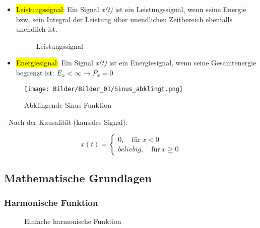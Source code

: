 \begin{itemize}[topsep=2pt]
     \item
     \hl{Leistungssignal}: Ein Signal {\itshape x(t)} ist ein Leistungssignal, wenn seine Energie bzw. sein Integral der Leistung über unendlichen Zeitbereich ebenfalls unendlich ist. \par
     \begin{figure}[h]
         \centering
         \subfigbottomskip=10pt
         \subfigcapskip=3pt
         \hspace{2cm}
     \caption{Leistungssignal}
     \end{figure}
     
     \item
     \hl{Energiesignal}: Ein Signal {\itshape x(t)} ist ein Energiesignal, wenn seine Gesamtenergie begrenzt ist: $E_{x}<\infty \to \bar{P_{x}}=0$\par
\end{itemize}
     
\begin{figure}[H]
    \centering
    \texttt{[image: Bilder/Bilder\_01/Sinus\_abklingt.png]}
    \caption{Abklingende Sinus-Funktion}
    \label{fig:Abklingende Sinus-Funktion}
\end{figure}

\hspace{2em} - Nach der Kausalität (kausales Signal):\par
\begin{equation}
    x(t)=\left\{
	\begin{aligned}
	0, \quad \mbox{für}\ x<0\\
	beliebig, \quad \mbox{für}\ x\ge 0
	\end{aligned}
	\right
	.
\end{equation}

\subsection{\textbf{Mathematische Grundlagen}}
\subsubsection{\textbf{Harmonische Funktion}}
\begin{figure}[h]
    \centering
    \subfigbottomskip=10pt
    \subfigcapskip=3pt
    \caption{Einfache harmonische Funktion}
    \label{fig:Einfache harmonische Funktion}
\end{figure}

